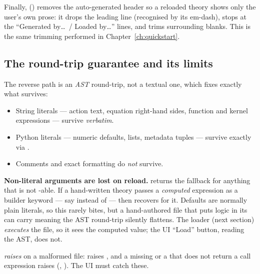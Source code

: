 Finally,  () removes the
auto-generated header so a reloaded theory shows only the user's own prose: it
drops the leading  line (recognised by
its em-dash), stops at the ``Generated by\dots\ / Loaded by\dots'' lines, and trims
surrounding blanks. This is the same trimming  performed in
Chapter~\ref{ch:quickstart}.

\subsection{The round-trip guarantee and its limits}

The reverse path is an \emph{AST} round-trip, not a textual one, which fixes
exactly what survives:

\begin{itemize}
  \item String literals --- action text, equation right-hand sides, function and
        kernel expressions --- survive \emph{verbatim}.
  \item Python literals --- numeric defaults,  lists, metadata
        tuples --- survive exactly via .
  \item Comments and exact formatting do \emph{not} survive.
\end{itemize}

\begin{gotcha}
\textbf{Non-literal arguments are lost on reload.}  returns the
fallback for anything that is not -able. If a hand-written
theory passes a \emph{computed} expression as a builder keyword --- say
 instead of  --- then
 recovers  for it. Defaults are normally
plain literals, so this rarely bites, but a hand-authored file that puts logic in
its  can carry meaning the AST round-trip silently flattens. The
loader (next section) \emph{executes} the file, so it sees the computed value; the
UI ``Load'' button, reading the AST, does not.
\end{gotcha}

\begin{gotcha}
 \emph{raises} on a malformed file: 
raises , and a missing  or a  that
does not return a call expression raises 
(, ). The UI must catch these.
\end{gotcha}

